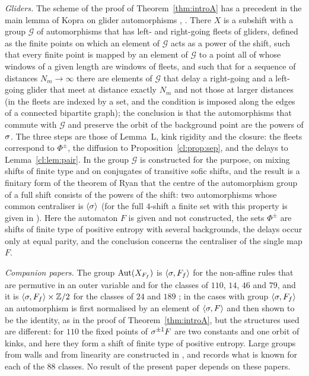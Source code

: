 \emph{Gliders.} The scheme of the proof of Theorem~\ref{thm:introA} has a precedent in the main lemma of Kopra on glider automorphisms \cite[Lemma~1]{Kopra2020}, \cite[Lemma~5.7]{Kopra2022}. There $X$ is a subshift with a group $\mathcal G$ of automorphisms that has left- and right-going fleets of gliders, defined as the finite points on which an element of $\mathcal G$ acts as a power of the shift, such that every finite point is mapped by an element of $\mathcal G$ to a point all of whose windows of a given length are windows of fleets, and such that for a sequence of distances $N_m\to\infty$ there are elements of $\mathcal G$ that delay a right-going and a left-going glider that meet at distance exactly $N_m$ and not those at larger distances (in \cite{Kopra2020} the fleets are indexed by a set, and the condition is imposed along the edges of a connected bipartite graph); the conclusion is that the automorphisms that commute with $\mathcal G$ and preserve the orbit of the background point are the powers of $\sigma$. The three steps are those of Lemma~L, kink rigidity and the closure: the fleets correspond to $\Phi^\pm$, the diffusion to Proposition~\ref{cl:prop:sep}, and the delays to Lemma~\ref{cl:lem:pair}. In \cite{Kopra2020,Kopra2022} the group $\mathcal G$ is constructed for the purpose, on mixing shifts of finite type and on conjugates of transitive sofic shifts, and the result is a finitary form of the theorem of Ryan \cite{Ryan1972} that the centre of the automorphism group of a full shift consists of the powers of the shift: two automorphisms whose common centraliser is $\langle\sigma\rangle$ (for the full $4$-shift a finite set with this property is given in \cite[Theorem~2.2]{Salo2019}). Here the automaton $F$ is given and not constructed, the sets $\Phi^\pm$ are shifts of finite type of positive entropy with several backgrounds, the delays occur only at equal parity, and the conclusion concerns the centraliser of the single map $F$.

\emph{Companion papers.} The group $\operatorname{Aut}(X_{F_f})$ is $\langle\sigma,F_f\rangle$ for the non-affine rules that are permutive in an outer variable \cite{PaperB} and for the classes of $110$, $14$, $46$ and $79$, and it is $\langle\sigma,F_f\rangle\times\mathbb{Z}/2$ for the classes of $24$ and $189$ \cite{PaperA}; in the cases with group $\langle\sigma,F_f\rangle$ an automorphism is first normalised by an element of $\langle\sigma,F\rangle$ and then shown to be the identity, as in the proof of Theorem~\ref{thm:introA}, but the structures used are different: for $110$ the fixed points of $\sigma^{\pm1}F$ are two constants and one orbit of kinks, and here they form a shift of finite type of positive entropy. Large groups from walls and from linearity are constructed in \cite{PaperC}, and \cite{PaperD} records what is known for each of the $88$ classes. No result of the present paper depends on these papers.

